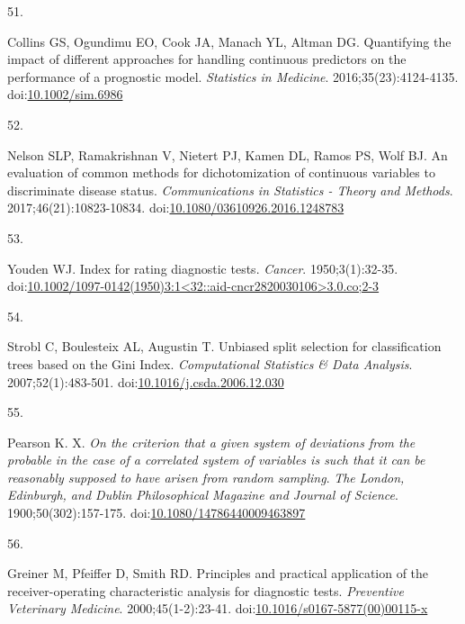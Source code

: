 \documentclass[
]{book}
\newlength{\cslhangindent}
\newlength{\csllabelwidth}
\newlength{\cslentryspacingunit} %
\newenvironment{CSLReferences}[2] %
 {%
  \setlength{\parindent}{0pt}
  \ifodd #1
  \let\oldpar\par
  \def\par{\hangindent=\cslhangindent\oldpar}
  \fi
  \setlength{\parskip}{#2\cslentryspacingunit}
 }%
 {}
\newcommand{\CSLLeftMargin}[1]{\parbox[t]{\csllabelwidth}{#1}}
\newcommand{\CSLRightInline}[1]{\parbox[t]{\linewidth - \csllabelwidth}{#1}\break}
\begin{document}
\begin{CSLReferences}{0}{0}
\leavevmode{}%
\CSLLeftMargin{51. }%
\CSLRightInline{Collins GS, Ogundimu EO, Cook JA, Manach YL, Altman DG. Quantifying the impact of different approaches for handling continuous predictors on the performance of a prognostic model. \emph{Statistics in Medicine}. 2016;35(23):4124-4135. doi:\href{https://doi.org/10.1002/sim.6986}{10.1002/sim.6986}}

\leavevmode{}%
\CSLLeftMargin{52. }%
\CSLRightInline{Nelson SLP, Ramakrishnan V, Nietert PJ, Kamen DL, Ramos PS, Wolf BJ. An evaluation of common methods for dichotomization of continuous variables to discriminate disease status. \emph{Communications in Statistics - Theory and Methods}. 2017;46(21):10823-10834. doi:\href{https://doi.org/10.1080/03610926.2016.1248783}{10.1080/03610926.2016.1248783}}

\leavevmode{}%
\CSLLeftMargin{53. }%
\CSLRightInline{Youden WJ. Index for rating diagnostic tests. \emph{Cancer}. 1950;3(1):32-35. doi:\href{https://doi.org/10.1002/1097-0142(1950)3:1\%3C32::aid-cncr2820030106\%3E3.0.co;2-3}{10.1002/1097-0142(1950)3:1\textless32::aid-cncr2820030106\textgreater3.0.co;2-3}}

\leavevmode{}%
\CSLLeftMargin{54. }%
\CSLRightInline{Strobl C, Boulesteix AL, Augustin T. Unbiased split selection for classification trees based on the Gini Index. \emph{Computational Statistics \& Data Analysis}. 2007;52(1):483-501. doi:\href{https://doi.org/10.1016/j.csda.2006.12.030}{10.1016/j.csda.2006.12.030}}

\leavevmode{}%
\CSLLeftMargin{55. }%
\CSLRightInline{Pearson K. X. {\emph{On the criterion that a given system of deviations from the probable in the case of a correlated system of variables is such that it can be reasonably supposed to have arisen from random sampling}}. \emph{The London, Edinburgh, and Dublin Philosophical Magazine and Journal of Science}. 1900;50(302):157-175. doi:\href{https://doi.org/10.1080/14786440009463897}{10.1080/14786440009463897}}

\leavevmode{}%
\CSLLeftMargin{56. }%
\CSLRightInline{Greiner M, Pfeiffer D, Smith RD. Principles and practical application of the receiver-operating characteristic analysis for diagnostic tests. \emph{Preventive Veterinary Medicine}. 2000;45(1-2):23-41. doi:\href{https://doi.org/10.1016/s0167-5877(00)00115-x}{10.1016/s0167-5877(00)00115-x}}


\end{CSLReferences}
\end{document}
